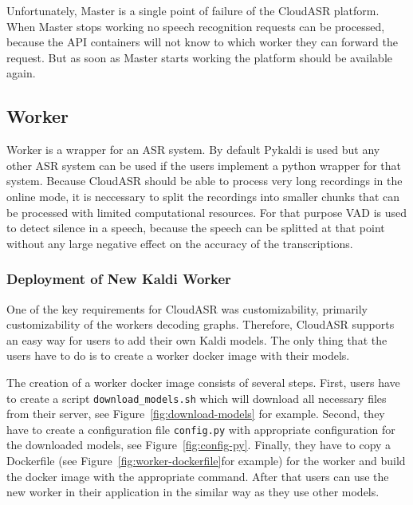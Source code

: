 Unfortunately, Master is a single point of failure of the CloudASR platform.
When Master stops working no speech recognition requests can be processed,
  because the API containers will not know to which worker they can forward the request.
But as soon as Master starts working the platform should be available again.


\subsection{Worker}
Worker is a wrapper for an ASR system.
By default Pykaldi is used but any other ASR system can be used
  if the users implement a python wrapper for that system.
Because CloudASR should be able to process very long recordings in the online mode,
  it is neccessary to split the recordings into smaller chunks
  that can be processed with limited computational resources.
For that purpose VAD is used to detect silence in a speech,
  because the speech can be splitted at that point without any large negative effect on the accuracy of the transcriptions.



\subsubsection{Deployment of New Kaldi Worker}
One of the key requirements for CloudASR was customizability,
  primarily customizability of the workers decoding graphs.
Therefore, CloudASR supports an easy way for users to add their own Kaldi models.
The only thing that the users have to do is to create a worker docker image with their models.

The creation of a worker docker image consists of several steps.
First, users have to create a script \texttt{download\_models.sh} which will download all necessary files from their server,
  see Figure~\ref{fig:download-models} for example.
Second, they have to create a configuration file \texttt{config.py} with appropriate configuration for the downloaded models,
  see Figure~\ref{fig:config-py}.
Finally, they have to copy a Dockerfile (see Figure~\ref{fig:worker-dockerfile}for example) for the worker
  and build the docker image with the appropriate command.
After that users can use the new worker in their application in the similar way as they use other models.

